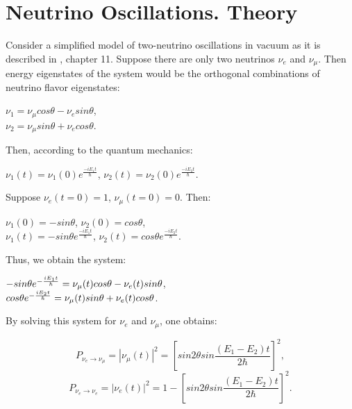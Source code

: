 \section{Neutrino Oscillations. Theory}


Consider a simplified model of two-neutrino oscillations in vacuum as it is described in \cite{ref_Griffiths}, chapter 11. Suppose there are only two neutrinos $\nu_e$ and $\nu_{\mu}$. Then energy eigenstates of the system would be the orthogonal combinations of neutrino flavor eigenstates:\\ 
\begin{center}
$\nu_1=\nu_{\mu}cos\theta-\nu_esin\theta$,\\ 
$\nu_2=\nu_{\mu}sin\theta+\nu_ecos\theta$.\\ 
\end{center}
Then, according to the quantum mechanics:\\ 
\begin{center}
$\nu_1(t)=\nu_1(0)e^{\frac{-iE_1t}{\hbar}}$, $\nu_2(t)=\nu_2(0)e^{\frac{-iE_2t}{\hbar}}$.\\ 
\end{center}
Suppose $\nu_e(t=0)=1$, $\nu_\mu(t=0)=0$. Then:\\ 
\begin{center}
$\nu_1(0)=-sin\theta$, $\nu_2(0)=cos\theta$,\\
$\nu_1(t)=-{sin\theta}e^{\frac{-iE_1t}{\hbar}}$, $\nu_2(t)={cos\theta}e^{\frac{-iE_2t}{\hbar}}$.\\ 
\end{center}
Thus, we obtain the system:\\ 
\begin{center}
$-{sin\theta}e^{-{{iE_1t} \over \hbar}}=\nu_\mu(t)cos\theta-\nu_e(t)sin\theta$,\\
${cos\theta}e^{-{{iE_2t} \over \hbar}}=\nu_\mu(t)sin\theta+\nu_e(t)cos\theta$.\\ 
\end{center}
By solving this system for $\nu_e$ and $\nu_\mu$, one obtains:\\ 
\begin{center}
\begin{equation}
\label{eq:P_twoNu1}
P_{\nu_e \rightarrow \nu_\mu} = |\nu_\mu(t)|^2=[{sin2\theta}sin{\frac{(E_1-E_2)t}{2\hbar}}]^2,
\end{equation}
\begin{equation}
\label{eq:P_twoNu2}
P_{\nu_e \rightarrow \nu_e}=|\nu_e(t)|^2=1-[{sin2\theta}sin{\frac{(E_1-E_2)t}{2\hbar}}]^2.
\end{equation}
\end{center}
